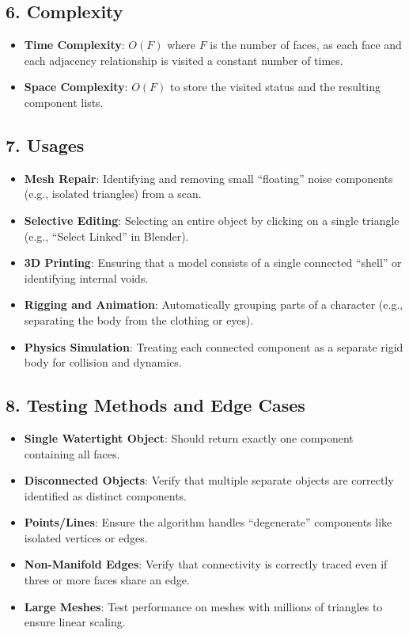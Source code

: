 \subsection{6. Complexity}

\begin{itemize}
    \item \textbf{Time Complexity}: $O(F)$ where $F$ is the number of faces, as each face and each adjacency relationship is visited a constant number of times.
    \item \textbf{Space Complexity}: $O(F)$ to store the visited status and the resulting component lists.
\end{itemize}

\subsection{7. Usages}

\begin{itemize}
    \item \textbf{Mesh Repair}: Identifying and removing small ``floating'' noise components (e.g., isolated triangles) from a scan.
    \item \textbf{Selective Editing}: Selecting an entire object by clicking on a single triangle (e.g., ``Select Linked'' in Blender).
    \item \textbf{3D Printing}: Ensuring that a model consists of a single connected ``shell'' or identifying internal voids.
    \item \textbf{Rigging and Animation}: Automatically grouping parts of a character (e.g., separating the body from the clothing or eyes).
    \item \textbf{Physics Simulation}: Treating each connected component as a separate rigid body for collision and dynamics.
\end{itemize}

\subsection{8. Testing Methods and Edge Cases}

\begin{itemize}
    \item \textbf{Single Watertight Object}: Should return exactly one component containing all faces.
    \item \textbf{Disconnected Objects}: Verify that multiple separate objects are correctly identified as distinct components.
    \item \textbf{Points/Lines}: Ensure the algorithm handles ``degenerate'' components like isolated vertices or edges.
    \item \textbf{Non-Manifold Edges}: Verify that connectivity is correctly traced even if three or more faces share an edge.
    \item \textbf{Large Meshes}: Test performance on meshes with millions of triangles to ensure linear scaling.
\end{itemize}

